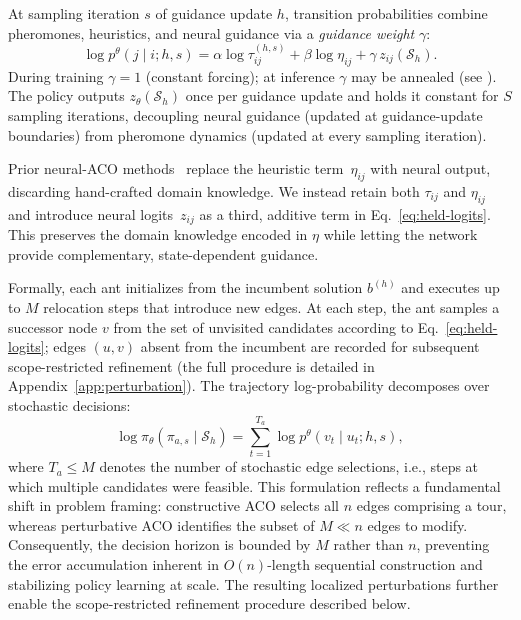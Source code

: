 \documentclass[sigconf,review]{acmart}
\begin{document}
At sampling iteration $s$ of guidance update $h$, transition probabilities combine pheromones, heuristics, and neural guidance via a \emph{guidance weight} $\gamma$:
\begin{equation}
\log p^\theta(j \mid i; h, s) = \alpha \log \tau^{(h,s)}_{ij} + \beta \log \eta_{ij} + \gamma\, z_{ij}(\mathcal{S}_h).
\label{eq:held-logits}
\end{equation}
During training $\gamma{=}1$ (constant forcing); at inference $\gamma$ may be annealed (see ).
The policy outputs $z_\theta(\mathcal{S}_h)$ once per guidance update and holds it constant for $S$ sampling iterations, decoupling neural guidance (updated at guidance-update boundaries) from pheromone dynamics (updated at every sampling iteration).

Prior neural-ACO methods~\cite{deepaco,gfacs,gtgaco} replace the heuristic term~$\eta_{ij}$ with neural output, discarding hand-crafted domain knowledge.
We instead retain both $\tau_{ij}$ and $\eta_{ij}$ and introduce neural logits~$z_{ij}$ as a third, additive term in Eq.~\eqref{eq:held-logits}.
This preserves the domain knowledge encoded in $\eta$ while letting the network provide complementary, state-dependent guidance.

Formally, each ant initializes from the incumbent solution $b^{(h)}$ and executes up to $M$ relocation steps that introduce new edges.
At each step, the ant samples a successor node $v$ from the set of unvisited candidates according to Eq.~\eqref{eq:held-logits}; edges $(u,v)$ absent from the incumbent are recorded for subsequent scope-restricted refinement (the full procedure is detailed in Appendix~\ref{app:perturbation}).
The trajectory log-probability decomposes over stochastic decisions:
\begin{equation}
\log \pi_\theta(\pi_{a,s} \mid \mathcal{S}_h) = \sum_{t=1}^{T_a} \log p^\theta(v_t \mid u_t; h, s),
\label{eq:logp-trajectory}
\end{equation}
where $T_a \le M$ denotes the number of stochastic edge selections, i.e., steps at which multiple candidates were feasible.
This formulation reflects a fundamental shift in problem framing: constructive ACO selects all $n$ edges comprising a tour, whereas perturbative ACO identifies the subset of $M \ll n$ edges to modify.
Consequently, the decision horizon is bounded by $M$ rather than $n$, preventing the error accumulation inherent in $O(n)$-length sequential construction and stabilizing policy learning at scale.
The resulting localized perturbations further enable the scope-restricted refinement procedure described below.
\end{document}
